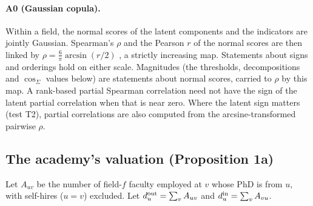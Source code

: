 \paragraph{A0 (Gaussian copula).} Within a field, the normal scores of the latent components and the indicators
are jointly Gaussian. Spearman's $\rho$ and the Pearson $r$ of the normal scores are then linked by
$\rho=\tfrac{6}{\pi}\arcsin(r/2)$ \citep{kruskal1958ordinal}, a strictly increasing map. Statements about signs
and orderings hold on either scale. Magnitudes (the thresholds, decompositions and $\cos_\Sigma$ values below) are
statements about normal scores, carried to $\rho$ by this map. A rank-based partial Spearman correlation need not
have the sign of the latent partial correlation when that is near zero. Where the latent sign matters (test T2),
partial correlations are also computed from the arcsine-transformed pairwise $\rho$.

\subsection{The academy's valuation (Proposition 1a)}\label{si:theory:academy}

Let $A_{uv}$ be the number of field-$f$ faculty employed at $v$ whose PhD is from $u$, with self-hires ($u=v$)
excluded. Let $d^{\rm out}_u=\sum_vA_{uv}$ and $d^{\rm in}_u=\sum_vA_{vu}$.

